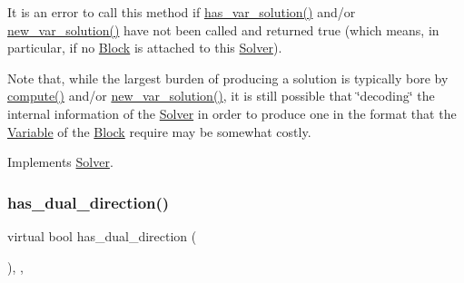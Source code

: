 It is an error to call this method if \mbox{\hyperlink{class_s_m_spp__di__unipi__it_1_1_m_c_f_solver_ade6d8078e2b6708ea0fa989629de2419}{has\+\_\+var\+\_\+solution()}} and/or \mbox{\hyperlink{class_s_m_spp__di__unipi__it_1_1_m_c_f_solver_a62678dc9f7485d5a2992c588c5dc7d49}{new\+\_\+var\+\_\+solution()}} have not been called and returned true (which means, in particular, if no \mbox{\hyperlink{class_s_m_spp__di__unipi__it_1_1_block}{Block}} is attached to this \mbox{\hyperlink{class_s_m_spp__di__unipi__it_1_1_solver}{Solver}}).

Note that, while the largest burden of producing a solution is typically bore by \mbox{\hyperlink{class_s_m_spp__di__unipi__it_1_1_m_c_f_solver_afc8ff54ab05d22f4cca0fb0bfbeb7a49}{compute()}} and/or \mbox{\hyperlink{class_s_m_spp__di__unipi__it_1_1_m_c_f_solver_a62678dc9f7485d5a2992c588c5dc7d49}{new\+\_\+var\+\_\+solution()}}, it is still possible that \char`\"{}decoding\char`\"{} the internal information of the \mbox{\hyperlink{class_s_m_spp__di__unipi__it_1_1_solver}{Solver}} in order to produce one in the format that the \mbox{\hyperlink{class_s_m_spp__di__unipi__it_1_1_variable}{Variable}} of the \mbox{\hyperlink{class_s_m_spp__di__unipi__it_1_1_block}{Block}} require may be somewhat costly. 

Implements \mbox{\hyperlink{class_s_m_spp__di__unipi__it_1_1_solver_a91d7cd0dc4fa453406ef30db2bfa37a5}{Solver}}.

\mbox{\label{class_s_m_spp__di__unipi__it_1_1_m_c_f_solver_a3a262f8106b76603f0828e41bbe5b022}} 
\subsubsection{\texorpdfstring{has\+\_\+dual\+\_\+direction()}{has\_dual\_direction()}}
{\footnotesize\ttfamily virtual bool has\+\_\+dual\+\_\+direction (\begin{DoxyParamCaption}\item[{void}]{ }\end{DoxyParamCaption})\hspace{0.3cm}{\ttfamily [inline]}, {\ttfamily [override]}, {\ttfamily [virtual]}}



